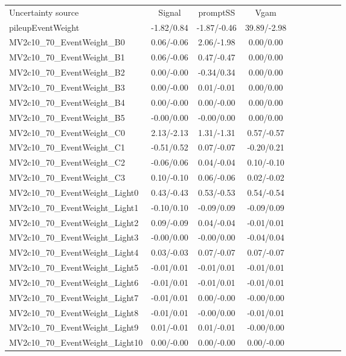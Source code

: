 \begin{table}[h]
\scriptsize
\begin{center}
\begin{tabular}{l|ccccccccc}
\hline
\hline
Uncertainty source &Signal &promptSS &Vgam \\
pileupEventWeight &-1.82/0.84 &-1.87/-0.46 &39.89/-2.98 \\
MV2c10\_70\_EventWeight\_B0 &0.06/-0.06 &2.06/-1.98 &0.00/0.00 \\
MV2c10\_70\_EventWeight\_B1 &0.06/-0.06 &0.47/-0.47 &0.00/0.00 \\
MV2c10\_70\_EventWeight\_B2 &0.00/-0.00 &-0.34/0.34 &0.00/0.00 \\
MV2c10\_70\_EventWeight\_B3 &0.00/-0.00 &0.01/-0.01 &0.00/0.00 \\
MV2c10\_70\_EventWeight\_B4 &0.00/-0.00 &0.00/-0.00 &0.00/0.00 \\
MV2c10\_70\_EventWeight\_B5 &-0.00/0.00 &-0.00/0.00 &0.00/0.00 \\
MV2c10\_70\_EventWeight\_C0 &2.13/-2.13 &1.31/-1.31 &0.57/-0.57 \\
MV2c10\_70\_EventWeight\_C1 &-0.51/0.52 &0.07/-0.07 &-0.20/0.21 \\
MV2c10\_70\_EventWeight\_C2 &-0.06/0.06 &0.04/-0.04 &0.10/-0.10 \\
MV2c10\_70\_EventWeight\_C3 &0.10/-0.10 &0.06/-0.06 &0.02/-0.02 \\
MV2c10\_70\_EventWeight\_Light0 &0.43/-0.43 &0.53/-0.53 &0.54/-0.54 \\
MV2c10\_70\_EventWeight\_Light1 &-0.10/0.10 &-0.09/0.09 &-0.09/0.09 \\
MV2c10\_70\_EventWeight\_Light2 &0.09/-0.09 &0.04/-0.04 &-0.01/0.01 \\
MV2c10\_70\_EventWeight\_Light3 &-0.00/0.00 &-0.00/0.00 &-0.04/0.04 \\
MV2c10\_70\_EventWeight\_Light4 &0.03/-0.03 &0.07/-0.07 &0.07/-0.07 \\
MV2c10\_70\_EventWeight\_Light5 &-0.01/0.01 &-0.01/0.01 &-0.01/0.01 \\
MV2c10\_70\_EventWeight\_Light6 &-0.01/0.01 &-0.01/0.01 &-0.01/0.01 \\
MV2c10\_70\_EventWeight\_Light7 &-0.01/0.01 &0.00/-0.00 &-0.00/0.00 \\
MV2c10\_70\_EventWeight\_Light8 &-0.01/0.01 &-0.00/0.00 &-0.01/0.01 \\
MV2c10\_70\_EventWeight\_Light9 &0.01/-0.01 &0.01/-0.01 &-0.00/0.00 \\
MV2c10\_70\_EventWeight\_Light10 &0.00/-0.00 &0.00/-0.00 &0.00/-0.00 \\

\end{tabular}
\end{center}
\end{table}
